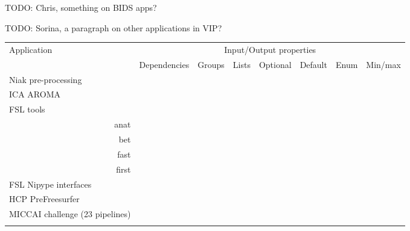 \documentclass{article}
\newcommand{\todo}[1]{\color{red}TODO: #1\color{black}}
\begin{document}
\todo{Chris, something on BIDS apps?}



\todo{Sorina, a paragraph on other applications in VIP?}

\begin{table}
  \begin{tabular}{l|ccccccc}
    \rowcolor[gray]{0.9}
    Application                      & \multicolumn{7}{c}{Input/Output properties} \\
    \rowcolor[gray]{0.9}
                                     & Dependencies      &Groups             & Lists             & Optional          &Default            & Enum              & Min/max\\
    
    \hline
    Niak pre-processing              &                   &\cellcolor{gray!75}&\cellcolor{gray!75}&\cellcolor{gray!75}&\cellcolor{gray!75}&\\
    ICA AROMA                        &\cellcolor{gray!75}&\cellcolor{gray!75}&                   &\cellcolor{gray!75}&\cellcolor{gray!75}&\cellcolor{gray!75}&\cellcolor{gray!75}\\
    FSL tools &&&&&&\\
    \multicolumn{1}{r|}{anat}        &\cellcolor{gray!75}&\cellcolor{gray!75}&                   &\cellcolor{gray!75}&\cellcolor{gray!75}&\cellcolor{gray!75}&\cellcolor{gray!75}\\
    \multicolumn{1}{r|}{bet}         &\cellcolor{gray!75}&\cellcolor{gray!75}&\cellcolor{gray!75}&\cellcolor{gray!75}&                   &                   &\cellcolor{gray!75}\\      
    \multicolumn{1}{r|}{fast}        &\cellcolor{gray!75}&                   &                   &\cellcolor{gray!75}&\cellcolor{gray!75}&\cellcolor{gray!75}&\cellcolor{gray!75}\\
    \multicolumn{1}{r|}{first}       &                   &                   &\cellcolor{gray!75}&\cellcolor{gray!75}&\cellcolor{gray!75}&                   &                   \\
    FSL Nipype interfaces     \\
    HCP PreFreesurfer                &                   &                   &                   &                   &                   &                   &                   \\
    MICCAI challenge (23 pipelines)\\&                   &                   &                   &                   &                   &                   & \\

\end{tabular}
\end{table}
\end{document}
